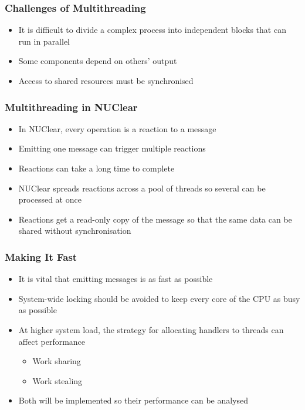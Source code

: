 \documentclass{beamer}
\begin{document}
	\begin{frame}
		\frametitle{Challenges of Multithreading}

		\begin{itemize}
			\item It is difficult to divide a complex process into independent blocks that can run in parallel
			\item Some components depend on others' output
			\item Access to shared resources must be synchronised
		\end{itemize}
	\end{frame}

	\begin{frame}
		\frametitle{Multithreading in NUClear}

		\begin{itemize}
			\item In NUClear, every operation is a reaction to a message
			\item Emitting one message can trigger multiple reactions
			\item Reactions can take a long time to complete
			\item NUClear spreads reactions across a pool of threads so several can be processed at once
			\item Reactions get a read-only copy of the message so that the same data can be shared without synchronisation
		\end{itemize}
	\end{frame}

	\begin{frame}
		\frametitle{Making It Fast}

		\begin{itemize}
			\item It is vital that emitting messages is as fast as possible
			\item System-wide locking should be avoided to keep every core of the CPU as busy as possible
			\item At higher system load, the strategy for allocating handlers to threads can affect performance
			\begin{itemize}
				\item Work sharing
				\item Work stealing
			\end{itemize}
			\item Both will be implemented so their performance can be analysed
		\end{itemize}
	\end{frame}
\end{document}
